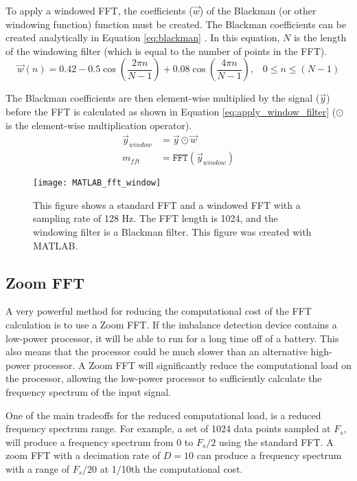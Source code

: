To apply a windowed FFT, the coefficients ($\vec{w}$) of the Blackman (or other windowing function) function must be created.  The Blackman coefficients can be created analytically in Equation \ref{eq:blackman} \cite{MATLAB_blackman}.  In this equation, $N$ is the length of the windowing filter (which is equal to the number of points in the FFT).
\begin{equation} \label{eq:blackman}
	\vec{w}(n) = 0.42 - 0.5 \cos{\left(\frac{2 \pi n}{N-1}\right)} + 0.08 \cos{\left(\frac{4 \pi n}{N-1}\right)}, \,\,\,\,\, 0 \leq n \leq (N-1)
\end{equation}

The Blackman coefficients are then element-wise multiplied by the signal ($\vec{y}$) before the FFT is calculated as shown in Equation \ref{eq:apply_window_filter} ($\odot$ is the element-wise multiplication operator).
\begin{align}
	\vec{y}_{window} &= \vec{y} \odot \vec{w} \\
	m_{fft} &= \texttt{FFT}\left(\vec{y}_{window} \right) \label{eq:apply_window_filter}
\end{align}


\begin{figure}
	\centering
	\texttt{[image: MATLAB\_fft\_window]}
	\decoRule
	\caption{This figure shows a standard FFT and a windowed FFT with a sampling rate of 128 Hz.  The FFT length is 1024, and the windowing filter is a Blackman filter.  This figure was created with MATLAB.}
	\label{fig:MATLAB_fft_window}
\end{figure}



\subsection{Zoom FFT}
A very powerful method for reducing the computational cost of the FFT calculation is to use a Zoom FFT.  If the imbalance detection device contains a low-power processor, it will be able to run for a long time off of a battery.  This also means that the processor could be much slower than an alternative high-power processor.  A Zoom FFT will significantly reduce the computational load on the processor, allowing the low-power processor to sufficiently calculate the frequency spectrum of the input signal.

One of the main tradeoffs for the reduced computational load, is a reduced frequency spectrum range.  For example, a set of 1024 data points sampled at $F_s$, will produce a frequency spectrum from $0$ to $F_s/2$ using the standard FFT.  A zoom FFT with a decimation rate of $D=10$ can produce a frequency spectrum with a range of $F_s/20$ at 1/10th the computational cost.

